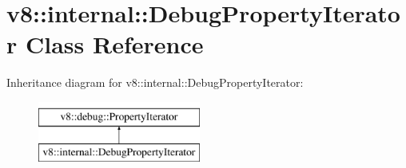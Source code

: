 \hypertarget{classv8_1_1internal_1_1DebugPropertyIterator}{}\section{v8\+:\+:internal\+:\+:Debug\+Property\+Iterator Class Reference}
\label{classv8_1_1internal_1_1DebugPropertyIterator}
Inheritance diagram for v8\+:\+:internal\+:\+:Debug\+Property\+Iterator\+:\begin{figure}[H]
\begin{center}
\leavevmode
\includegraphics[height=2.000000cm]{classv8_1_1internal_1_1DebugPropertyIterator}
\end{center}
\end{figure}
